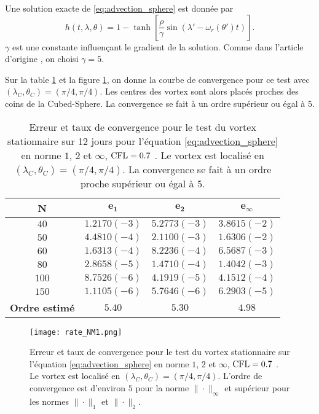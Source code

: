 Une solution exacte de \eqref{eq:advection_sphere} est donnée par
\begin{equation}
h(t, \lambda, \theta) = 1 - \tanh \left[ \dfrac{\rho}{\gamma} \sin (\lambda' - \omega_r (\theta') t) \right].
\label{eq:NM_solexacte}
\end{equation}
$\gamma$ est une constante influençant le gradient de la solution. Comme dans l'article d'origine \cite{Nair2002}, on choisi $\gamma = 5$.

Sur la table \ref{tab:rate1_NM} et la figure \ref{fig:rate1_NM}, on donne la courbe de convergence pour ce test avec $(\lambda_C, \theta_C)=(\pi /4 , \pi /4)$. Les centres des vortex sont alors placés proches des coins de la Cubed-Sphere. La convergence se fait à un ordre supérieur ou égal à $5$.

\begin{table}[htbp]
\begin{center}
\begin{tabular}{|c||c|c|c|}
\hline
\textbf{N}  & $\mathbf{e_1}$ & $\mathbf{e_2}$ & $\mathbf{e_{\infty}}$\\
\hline
\hline
$40$  & $1.2170 (-3)$ & $5.2773 (-3)$ & $3.8615 (-2)$ \\
$50$  & $4.4810 (-4)$ & $2.1100 (-3)$ & $1.6306 (-2)$ \\
$60$  & $1.6313 (-4)$ & $8.2236 (-4)$ & $6.5687 (-3)$ \\
$80$  & $2.8658 (-5)$ & $1.4710 (-4)$ & $1.4042 (-3)$ \\
$100$  & $8.7526 (-6)$ & $4.1919 (-5)$ & $4.1512 (-4)$ \\
$150$  & $1.1105 (-6)$ & $5.7646 (-6)$ & $6.2903 (-5)$ \\
\hline 
\hline
\textbf{Ordre estimé}& $5.40$ & $5.30$ & $4.98$\\
\hline
\end{tabular}
\end{center}
\caption{Erreur et taux de convergence pour le test du vortex stationnaire sur 12 jours pour l'équation \eqref{eq:advection_sphere} en norme $1$, $2$ et $\infty$, $\text{CFL} = 0.7$ \cite{Nair2002}. Le vortex est localisé en $(\lambda_C, \theta_C)=(\pi /4 , \pi /4)$. La convergence se fait à un ordre proche supérieur ou égal à $5$.}
\label{tab:rate1_NM}
\end{table} 

\begin{figure}[htbp]
\begin{center}
\texttt{[image: rate\_NM1.png]}
\end{center}
\caption{Erreur et taux de convergence pour le test du vortex stationnaire sur l'équation \eqref{eq:advection_sphere} en norme $1$, $2$ et $\infty$, $\text{CFL} = 0.7$ \cite{Nair2002}. Le vortex est localisé en $(\lambda_C, \theta_C)=(\pi /4 , \pi /4)$. L'ordre de convergence est d'environ $5$ pour la norme $\| \cdot \|_{\infty}$ et supérieur pour les normes $\| \cdot \|_{1}$ et $\| \cdot \|_{2}$.}
\label{fig:rate1_NM}
\end{figure} 

